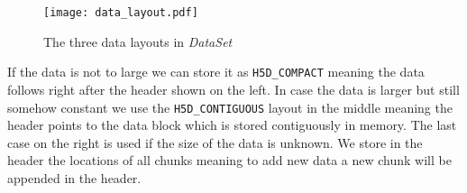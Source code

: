 \documentclass{article}
\begin{document}
\begin{figure}[h!]
\centering
\texttt{[image: data\_layout.pdf]}
\caption{The three data layouts in \textit{DataSet}}
\label{fig:datalayout}
\end{figure}

If the data is not to large we can store it as \texttt{H5D\_COMPACT} meaning the data follows right after the header shown on the left. In case the data is larger but still somehow constant we use the \texttt{H5D\_CONTIGUOUS} layout in the middle meaning the header points to the data block which is stored contiguously in memory. The last case on the right is used if the size of the data is unknown. We store in the header the locations of all chunks meaning to add new data a new chunk will be appended in the header.

\end{document}
